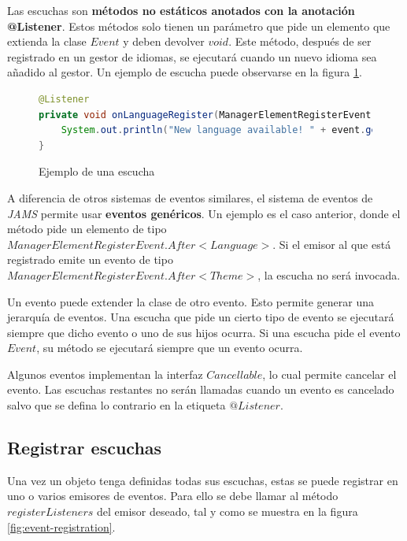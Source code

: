 Las escuchas son \textbf{métodos no estáticos anotados con la anotación @Listener}.
Estos métodos solo tienen un parámetro que pide un elemento que extienda la clase
$Event$ y deben devolver $void$.
Este método, después de ser registrado en un gestor de idiomas,
se ejecutará cuando un nuevo idioma sea añadido al gestor.
Un ejemplo de escucha puede observarse en la figura \ref{fig:listener}.

\begin{figure}[h]
    \centering
    \begin{lstlisting}[language=Java,style=java,frame=single,label={lst:listeners}]
@Listener
private void onLanguageRegister(ManagerElementRegisterEvent.After<Language> event) {
    System.out.println("New language available! " + event.getElement().getName());
}
    \end{lstlisting}
    \caption{Ejemplo de una escucha}
    \label{fig:listener}
\end{figure}

\noindent A diferencia de otros sistemas de eventos similares,
el sistema de eventos de \textit{JAMS} permite usar \textbf{eventos genéricos}.
Un ejemplo es el caso anterior, donde el método pide un elemento de tipo
$ManagerElementRegisterEvent.After<Language>$.
Si el emisor al que está registrado emite un evento de tipo
$ManagerElementRegisterEvent.After<Theme>$, la escucha no será invocada.

\noindent Un evento puede extender la clase de otro evento.
Esto permite generar una jerarquía de eventos.
Una escucha que pide un cierto tipo de evento se ejecutará siempre que dicho evento o uno de sus hijos ocurra.
Si una escucha pide el evento $Event$, su método se ejecutará siempre que un evento ocurra.

\noindent Algunos eventos implementan la interfaz $Cancellable$, lo cual permite cancelar el evento.
Las escuchas restantes no serán llamadas cuando un evento es cancelado salvo que se defina lo contrario
en la etiqueta $@Listener$.

\subsection{Registrar escuchas}\label{subsec:registrar-escuchas}

Una vez un objeto tenga definidas todas sus escuchas, estas
se puede registrar en uno o varios emisores de eventos.
Para ello se debe llamar al método $registerListeners$ del
emisor deseado, tal y como se muestra en la figura \ref{fig:event-registration}.


